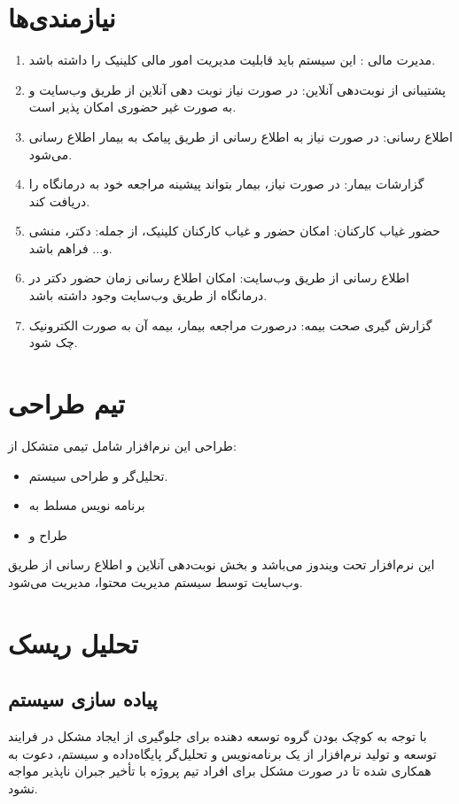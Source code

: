 \documentclass[a4paper,12pt]{report}
\begin{document}
	\section{نیازمندی‌ها}\label{sec1:chap1}
	\begin{enumerate}[nosep]\label{enum1:sec1:chap1}
		\item 
		مدیرت مالی : این سیستم باید قابلیت مدیریت امور مالی کلینیک را داشته باشد.				
		\item 
		پشتیبانی از نوبت‌دهی آنلاین: در صورت نیاز نوبت دهی آنلاین از طریق وب‌سایت و به صورت غیر حضوری امکان پذیر است.
		\item 
		 اطلاع رسانی: در صورت نیاز به اطلاع رسانی از طریق پیامک به بیمار اطلاع رسانی  می‌شود.
		\item 
		 گزارشات بیمار: در صورت نیاز، بیمار بتواند پیشینه مراجعه خود به درمانگاه را دریافت کند.		 
		\item 
		حضور غیاب کارکنان: امکان حضور و غیاب کارکنان کلینیک، از جمله: دکتر، منشی و... فراهم باشد.
		\item 
		اطلاع رسانی از طریق وب‌سایت: امکان اطلاع رسانی زمان حضور دکتر در درمانگاه از طریق وب‌سایت وجود داشته باشد.
		
		\item 
		گزارش گیری صحت بیمه: درصورت مراجعه بیمار، بیمه آن به صورت الکترونیک چک شود.
		
	\end{enumerate}
	\section{تیم طراحی}\label{sec2:chap1}
	طراحی این نرم‌افزار شامل تیمی متشکل از:
	\begin{itemize}[nosep]\label{item1:sec2:chap1}
		\item 
		تحلیل‌گر و طراحی سیستم.
		\item 
		برنامه نویس مسلط به
		\item 
		طراح
		 و 
		
	\end{itemize}
	این نرم‌افزار تحت ویندوز می‌باشد و بخش نوبت‌دهی آنلاین و اطلاع رسانی از طریق وب‌سایت توسط سیستم مدیریت محتوا، مدیریت می‌شود.

	\section{تحلیل ریسک}\label{sec3:chap1}
	\subsection{پیاده سازی سیستم}\label{subsec1:sec3:chap1}
	با توجه به کوچک بودن گروه توسعه دهنده برای جلوگیری از ایجاد مشکل در فرایند توسعه و تولید نرم‌افزار از یک برنامه‌نویس و تحلیل‌گر پایگاه‌داده و سیستم، دعوت به همکاری شده تا در صورت مشکل برای افراد تیم پروژه با تأخیر جبران ناپذیر مواجه نشود.
	
\end{document}
